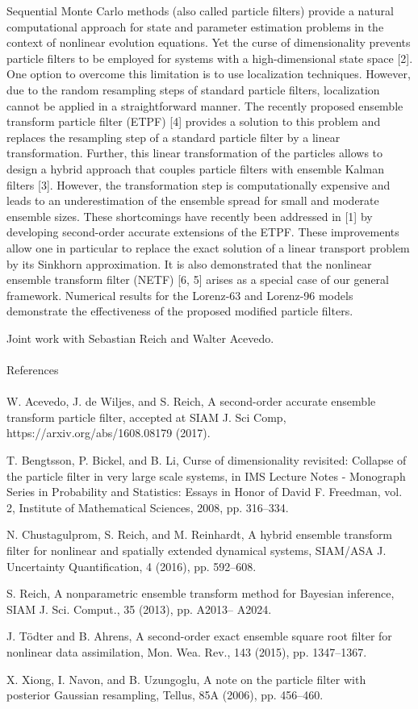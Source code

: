 Sequential Monte Carlo methods (also called particle filters) provide a
natural computational approach for state and parameter estimation
problems in the context of nonlinear evolution equations. Yet the
curse of dimensionality prevents particle filters to be employed for
systems with a high-dimensional state space [2]. One option to
overcome this limitation is to use localization techniques. However,
due to the random resampling steps of standard particle filters,
localization cannot be applied in a straightforward manner. The
recently proposed ensemble transform particle filter (ETPF) [4]
provides a solution to this problem and replaces the resampling step
of a standard particle filter by a linear transformation. Further, this
linear transformation of the particles allows to design a hybrid
approach that couples particle filters with ensemble Kalman filters
[3]. However, the transformation step is computationally expensive
and leads to an underestimation of the ensemble spread for small
and moderate ensemble sizes.
These shortcomings have recently been addressed in [1] by
developing second-order accurate extensions of the ETPF. These
improvements allow one in particular to replace the exact solution of
a linear transport problem by its Sinkhorn approximation. It is also
demonstrated that the nonlinear ensemble transform filter (NETF) [6,
5] arises as a special case of our general framework. Numerical
results for the Lorenz-63 and Lorenz-96 models demonstrate the
effectiveness of the proposed modified particle filters.

Joint work with Sebastian Reich and Walter Acevedo.
\\
\\
\noindent References
\\
\\
\noindent [1] W. Acevedo, J. de Wiljes, and S. Reich, A second-order accurate
ensemble transform particle filter, accepted at SIAM J. Sci Comp,
https://arxiv.org/abs/1608.08179 (2017).

\noindent [2] T. Bengtsson, P. Bickel, and B. Li, Curse of dimensionality
revisited: Collapse of the particle filter in very large scale systems, in
IMS Lecture Notes - Monograph Series in Probability and Statistics:
Essays in Honor of David F. Freedman, vol. 2, Institute of
Mathematical Sciences, 2008, pp. 316–334.

\noindent [3] N. Chustagulprom, S. Reich, and M. Reinhardt, A hybrid ensemble
transform filter for nonlinear and spatially extended dynamical
systems, SIAM/ASA J. Uncertainty Quantification, 4 (2016), pp. 592–608.

\noindent [4] S. Reich, A nonparametric ensemble transform method for
Bayesian inference, SIAM J. Sci. Comput., 35 (2013), pp. A2013–
A2024.

\noindent [5] J. Tödter and B. Ahrens, A second-order exact ensemble square
root filter for nonlinear data assimilation, Mon. Wea. Rev., 143
(2015), pp. 1347–1367.

\noindent [6] X. Xiong, I. Navon, and B. Uzungoglu, A note on the particle filter
with posterior Gaussian resampling, Tellus, 85A (2006), pp. 456–460.
